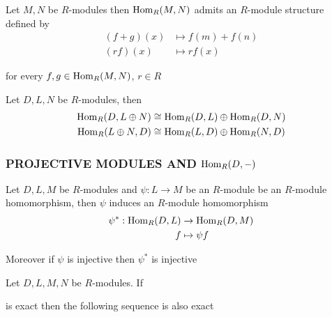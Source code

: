 \begin{remark}
	Let $M, N$ be $R$-modules then $\operatorname{Hom}_R(M, N)$ admits an $R$-module structure defined by
	\begin{align*}
		(f + g)(x) &\mapsto f(m) + f(n) \\
		(r f)(x) &\mapsto r f(x)
	\end{align*}
	
	for every $f, g \in \operatorname{Hom}_R(M, N)$, $r \in R$
\end{remark}

\begin{proposition}
	Let $D, L, N$ be $R$-modules, then
	\begin{align*}
		\operatorname{Hom}_R(D, L \oplus N) &\cong \operatorname{Hom}_R(D, L) \oplus \operatorname{Hom}_R(D, N) \\
		\operatorname{Hom}_R(L \oplus N, D) &\cong \operatorname{Hom}_R(L, D) \oplus \operatorname{Hom}_R(N, D)
	\end{align*}
\end{proposition}

\subsubsection{PROJECTIVE MODULES AND $\operatorname{Hom}_R(D, -)$} 

\begin{proposition}
	Let $D, L, M$ be $R$-modules and $\psi: L \to M$ be an $R$-module be an $R$-module homomorphism, then $\psi$ induces an $R$-module homomorphism
	\begin{align*}
		\psi^*: \operatorname{Hom}_R(D, L) &\to \operatorname{Hom}_R(D, M) \\
		f &\mapsto \psi f
	\end{align*}
	
	Moreover if $\psi$ is injective then $\psi^*$ is injective
\end{proposition}

\begin{theorem}
	Let $D, L, M, N$ be $R$-modules. If
	\begin{center}
	\end{center}
	
	is exact then the following sequence is also exact
	\begin{center}
	\end{center}
\end{theorem}

